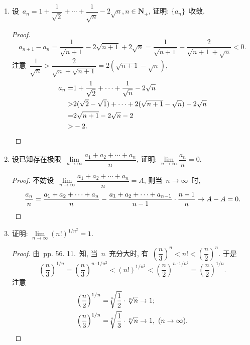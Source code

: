 \documentclass[UTF8,a4paper,11pt,twoside]{book}
\begin{document}
\begin{enumerate}
	\item 设~$a_n=1+\dfrac{1}{\sqrt{2}}+\cdots+\dfrac{1}{\sqrt{n}}-2\sqrt{n}, n\in\mathbf{N}_{+}$, 证明: $\{a_n\}$~收敛.
	      \begin{proof}
		      \[
			      a_{n+1}-a_n=\dfrac{1}{\sqrt{n+1}}-2\sqrt{n+1}+2\sqrt{n}=\dfrac{1}{\sqrt{n+1}}-\dfrac{2}{\sqrt{n+1}+\sqrt{n}}<0.
		      \]
		      注意~$\dfrac{1}{\sqrt{n}}>\dfrac{2}{\sqrt{n}+\sqrt{n+1}}=2(\sqrt{n+1}-\sqrt{n})$,
		      \[
			      \begin{split}
				      a_n=&1+\dfrac{1}{\sqrt{2}}+\cdots+\dfrac{1}{\sqrt{n}}-2\sqrt{n}\\
				      >&2(\sqrt{2}-\sqrt{1})+\cdots+2(\sqrt{n+1}-\sqrt{n})-2\sqrt{n}\\
				      =&2\sqrt{n+1}-2\sqrt{n}-2\\
				      >&-2. \qedhere
			      \end{split}
		      \]
	      \end{proof}
	\item 设已知存在极限~$\lim\limits_{n\to\infty} \dfrac{a_1+a_2+\cdots+a_n}{n}$, 证明: $\lim\limits_{n\to\infty} \dfrac{a_n}{n}=0$.
	      \begin{proof}
		      不妨设~$\lim\limits_{n\to\infty} \dfrac{a_1+a_2+\cdots+a_n}{n}=A$, 则当~$n\to\infty$~时,
		      \[
			      \dfrac{a_n}{n}=\dfrac{a_1+a_2+\cdots+a_n}{n}-\dfrac{a_1+a_2+\cdots+a_{n-1}}{n-1}\cdot\dfrac{n-1}{n}\to A-A=0. \qedhere
		      \]
	      \end{proof}

	\item 证明: $\lim\limits_{n\to\infty} (n!)^{1/n^2}=1$.
	      \begin{proof}
		      由~pp. 56. 11.~知, 当~$n$~充分大时, 有~$\left(\dfrac{n}{3}\right)^n<n!<\left(\dfrac{n}{2}\right)^n$. 于是
		      \[
			      \left(\dfrac{n}{3}\right)^{1/n}=\left(\dfrac{n}{3}\right)^{n\cdot 1/n^2}<(n!)^{1/n^2}<\left(\dfrac{n}{2}\right)^{n\cdot 1/n^2}=\left(\dfrac{n}{2}\right)^{1/n}.
		      \]
		      注意
		      \[
			      \begin{split}
				      \left(\dfrac{n}{2}\right)^{1/n}=&\sqrt[n]{\dfrac{1}{2}}\cdot\sqrt[n]{n}\to 1;\\
				      \left(\dfrac{n}{3}\right)^{1/n}=&\sqrt[n]{\dfrac{1}{3}}\cdot\sqrt[n]{n}\to 1, \ (n\to\infty). \qedhere
			      \end{split}
		      \]
	      \end{proof}


\end{enumerate}
\end{document}
